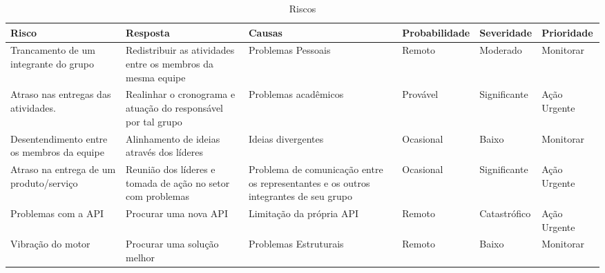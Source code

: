\begin{apendicesenv}
\begin{table}[h!]
\centering
\caption{Riscos}
\label{my-label}
\begin{tabular}{|p{3cm}p{3cm}p{2cm}p{1.5cm}p{1.5cm}p{2cm}|}
	\hline
	\multicolumn{1}{|l|}{\textbf{Risco}}                                 & \multicolumn{1}{l|}{\textbf{Resposta}}                        & \multicolumn{1}{l|}{\textbf{Causas}}                                                 & \multicolumn{1}{l|}{\textbf{Probabilidade}} & \multicolumn{1}{l|}{\textbf{Severidade}} & \textbf{Prioridade} \\ \hline
	Trancamento de um integrante do grupo                                & Redistribuir as atividades entre os membros da mesma equipe   & Problemas Pessoais                                                                   & Remoto                                      & Moderado                                 & Monitorar           \\
	Atraso nas entregas das atividades.& Realinhar o cronograma e atuação do responsável por tal grupo & Problemas acadêmicos                                                                 & Provável                                    & Significante                             & Ação Urgente        \\
	Desentendimento entre os membros da equipe                           & Alinhamento de ideias através dos líderes                     & Ideias divergentes                                                                   & Ocasional                                   & Baixo                                    & Monitorar           \\
	Atraso na entrega de um produto/serviço                              & Reunião dos líderes e tomada de ação no setor com problemas   & Problema de comunicação entre os representantes e os outros integrantes de seu grupo & Ocasional                                   & Significante                             & Ação Urgente        \\
	Problemas com a API                                                  & Procurar uma nova API                                         & Limitação da própria API                                                             & Remoto                                      & Catastrófico                             & Ação Urgente        \\
	Vibração do motor                                                    & Procurar uma solução melhor                                   & Problemas Estruturais                                                                & Remoto                                      & Baixo                                    & Monitorar           \\

\end{tabular}
\end{table}
\end{apendicesenv}

